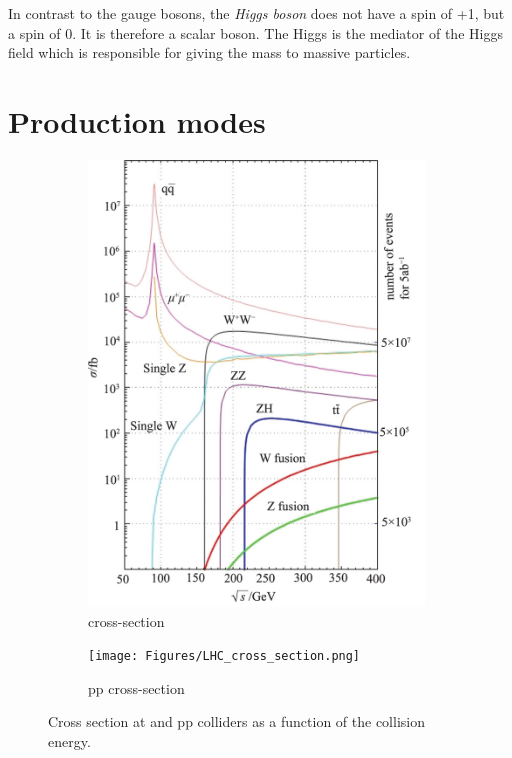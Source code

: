In contrast to the gauge bosons, the \textit{Higgs boson} does not have a spin of +1, but a spin of 0.
It is therefore a scalar boson.
The Higgs is the mediator of the Higgs field which is responsible for giving the mass to massive particles.

\section{Production modes}
\label{Production_modes}

\begin{figure}
\centering
\begin{subfigure}[b]{0.4\textwidth}
\includegraphics[width=0.98\textwidth]{Figures/ILC_cross_section.png}
\caption{\positron \electron cross-section~\cite{ILC_cross}}
\end{subfigure}
\begin{subfigure}[b]{0.4\textwidth}
\texttt{[image: Figures/LHC\_cross\_section.png]}
\caption{pp cross-section~\cite{LHC_cross}}
\end{subfigure}
\caption[Cross sections for ILC and LHC]{Cross section at \positron \electron and pp colliders as a function of the collision energy. }%
\label{fig:Cross_sections}
\end{figure}

